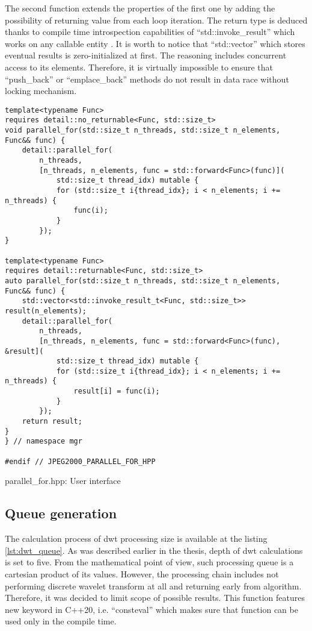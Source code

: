 The second function extends the properties of the first one by adding the possibility of returning
value from each loop iteration. The return type is deduced thanks to compile time introspection
capabilities of ``std::invoke\_result'' which works on any callable entity \cite{cppreference}. 
It is worth to notice that ``std::vector'' which stores eventual results is zero-initialized
at first. The reasoning includes concurrent access to its elements. Therefore, it is virtually
impossible to ensure that ``push\_back'' or ``emplace\_back'' methods do not result in data race
without locking mechanism.

\begin{listing}[!htb]
\begin{verbatim}
template<typename Func>
requires detail::no_returnable<Func, std::size_t>
void parallel_for(std::size_t n_threads, std::size_t n_elements, Func&& func) {
    detail::parallel_for(
        n_threads,
        [n_threads, n_elements, func = std::forward<Func>(func)](
            std::size_t thread_idx) mutable {
            for (std::size_t i{thread_idx}; i < n_elements; i += n_threads) {
                func(i);
            }
        });
}

template<typename Func>
requires detail::returnable<Func, std::size_t>
auto parallel_for(std::size_t n_threads, std::size_t n_elements, Func&& func) {
    std::vector<std::invoke_result_t<Func, std::size_t>> result(n_elements);
    detail::parallel_for(
        n_threads,
        [n_threads, n_elements, func = std::forward<Func>(func), &result](
            std::size_t thread_idx) mutable {
            for (std::size_t i{thread_idx}; i < n_elements; i += n_threads) {
                result[i] = func(i);
            }
        });
    return result;
}
} // namespace mgr

#endif // JPEG2000_PARALLEL_FOR_HPP
\end{verbatim}
\caption{parallel\_for.hpp: User interface}
\label{lst:parallel_for_user_interface}
\end{listing}

\subsection{Queue generation}

The calculation process of dwt processing size is available at the listing \ref{lst:dwt_queue}.
As was described earlier in the thesis, depth of dwt calculations is set to five. From the
mathematical point of view, such processing queue is a cartesian product of its values.
However, the processing chain includes not performing discrete wavelet transform at all
and returning early from algorithm. Therefore, it was decided to limit scope of possible
results. This function features new keyword in C++20, i.e. ``consteval'' which makes sure
that function can be used only in the compile time.

